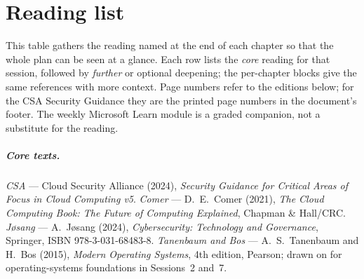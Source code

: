 \chapter*{Reading list}

This table gathers the reading named at the end of each chapter so that the
whole plan can be seen at a glance. Each row lists the \emph{core} reading for
that session, followed by \emph{further} or optional deepening; the
per-chapter blocks give the same references with more context. Page numbers
refer to the editions below; for the CSA Security Guidance they are the
printed page numbers in the document's footer. The weekly Microsoft Learn
module is a graded companion, not a substitute for the reading.

\paragraph{Core texts.}
\emph{CSA} --- Cloud Security Alliance (2024), \emph{Security Guidance for
Critical Areas of Focus in Cloud Computing v5}.
\emph{Comer} --- D.~E.~Comer (2021), \emph{The Cloud Computing Book: The Future
of Computing Explained}, Chapman \& Hall/CRC.
\emph{J\o sang} --- A.~J\o sang (2024), \emph{Cybersecurity: Technology and
Governance}, Springer, ISBN 978-3-031-68483-8.
\emph{Tanenbaum and Bos} --- A.~S.~Tanenbaum and H.~Bos (2015), \emph{Modern
Operating Systems}, 4th edition, Pearson; drawn on for operating-systems
foundations in Sessions~2 and~7.

